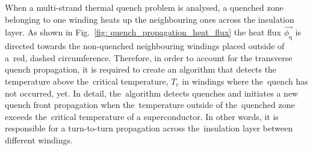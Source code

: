 
When a multi-strand thermal quench problem is analysed, a quenched zone belonging to one winding heats up the neighbouring ones across the insulation layer. As shown in Fig.~\ref{fig: quench_propagation_heat_flux} the heat flux $\vec{\phi_\text{q}}$ is directed towards the non-quenched neighbouring windings placed outside of a~red, dashed circumference. Therefore, in order to account for the transverse quench propagation, it is required to create an algorithm that detects the temperature above the~critical temperature, $T_\text{c}$ in windings where the~quench has not occurred, yet. In detail, the~algorithm detects quenches and initiates a new quench front propagation when the~temperature outside of the~quenched zone exceeds the~critical temperature of a superconductor. In other words, it is responsible for a turn-to-turn propagation across the~insulation layer between different windings.

